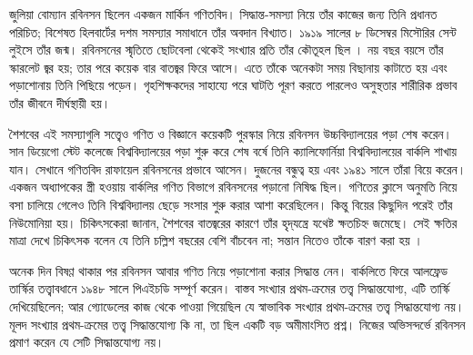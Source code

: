 \documentclass[../../../include/open-logic-section]{subfiles}
\begin{document}



জুলিয়া বোম্যান রবিনসন ছিলেন একজন মার্কিন গণিতবিদ।
সিদ্ধান্ত-সমস্যা নিয়ে তাঁর কাজের জন্য তিনি প্রধানত
পরিচিত; বিশেষত হিলবার্টের দশম সমস্যার সমাধানে
তাঁর অবদান বিখ্যাত। ১৯১৯ সালের ৮ ডিসেম্বর
মিসৌরির সেন্ট লুইসে তাঁর জন্ম। রবিনসনের স্মৃতিতে
ছোটবেলা থেকেই সংখ্যার প্রতি তাঁর কৌতূহল ছিল
\citep[4]{Reid1986}। নয় বছর বয়সে তাঁর
স্কারলেট জ্বর হয়; তার পরে কয়েক বার বাতজ্বর
ফিরে আসে। এতে তাঁকে অনেকটা সময় বিছানায়
কাটাতে হয় এবং পড়াশোনায় তিনি পিছিয়ে পড়েন।
গৃহশিক্ষকদের সাহায্যে পরে ঘাটতি পূরণ করতে
পারলেও অসুস্থতার শারীরিক প্রভাব তাঁর জীবনে
দীর্ঘস্থায়ী হয়।

শৈশবের এই সমস্যাগুলি সত্ত্বেও গণিত ও বিজ্ঞানে
কয়েকটি পুরস্কার নিয়ে রবিনসন উচ্চবিদ্যালয়ের
পড়া শেষ করেন। সান ডিয়েগো স্টেট কলেজে
বিশ্ববিদ্যালয়ের পড়া শুরু করে শেষ বর্ষে তিনি
ক্যালিফোর্নিয়া বিশ্ববিদ্যালয়ের বার্কলি শাখায়
যান। সেখানে গণিতবিদ রাফায়েল রবিনসনের
প্রভাবে আসেন। দুজনের বন্ধুত্ব হয় এবং ১৯৪১
সালে তাঁরা বিয়ে করেন। একজন অধ্যাপকের স্ত্রী
হওয়ায় বার্কলির গণিত বিভাগে রবিনসনের
পড়ানো নিষিদ্ধ ছিল। গণিতের ক্লাসে অনুমতি
নিয়ে বসা চালিয়ে গেলেও তিনি বিশ্ববিদ্যালয়
ছেড়ে সংসার শুরু করার আশা করেছিলেন।
কিন্তু বিয়ের কিছুদিন পরেই তাঁর নিউমোনিয়া
হয়। চিকিৎসকেরা জানান, শৈশবের বাতজ্বরের
কারণে তাঁর হৃদ্‌যন্ত্রে যথেষ্ট ক্ষতচিহ্ন জমেছে।
সেই ক্ষতির মাত্রা দেখে চিকিৎসক বলেন যে
তিনি চল্লিশ বছরের বেশি বাঁচবেন না; সন্তান
নিতেও তাঁকে বারণ করা হয় \citep[13]{Reid1986}।

অনেক দিন বিষণ্ণ থাকার পর রবিনসন আবার
গণিত নিয়ে পড়াশোনা করার সিদ্ধান্ত নেন।
বার্কলিতে ফিরে আলফ্রেড তার্স্কির তত্ত্বাবধানে
১৯৪৮ সালে পিএইচডি সম্পূর্ণ করেন। বাস্তব
সংখ্যার প্রথম-ক্রমের তত্ত্ব সিদ্ধান্তযোগ্য, এটি
তার্স্কি দেখিয়েছিলেন; আর গ্যোডেলের কাজ
থেকে পাওয়া গিয়েছিল যে স্বাভাবিক সংখ্যার
প্রথম-ক্রমের তত্ত্ব সিদ্ধান্তযোগ্য নয়। মূলদ
সংখ্যার প্রথম-ক্রমের তত্ত্ব সিদ্ধান্তযোগ্য কি না,
তা ছিল একটি বড় অমীমাংসিত প্রশ্ন। নিজের
অভিসন্দর্ভে \citeyearpar{Robinson1949}
রবিনসন প্রমাণ করেন যে সেটি সিদ্ধান্তযোগ্য নয়।
\end{document}
